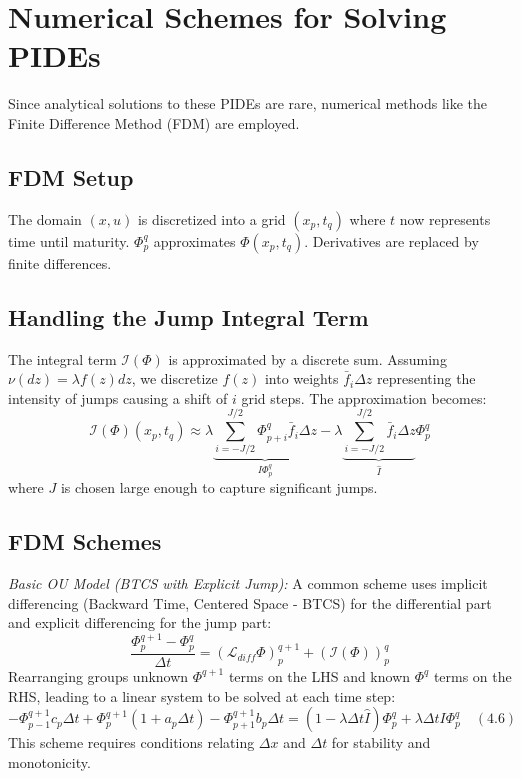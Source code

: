 \documentclass[11pt,twoside,openright]{report}
\begin{document}
\section{Numerical Schemes for Solving PIDEs}

Since analytical solutions to these PIDEs are rare, numerical methods like the Finite Difference Method (FDM) are employed.

\subsection{FDM Setup}
The domain $(x, u)$ is discretized into a grid $(x_p, t_q)$ where $t$ now represents time until maturity. $\Phi^q_p$ approximates $\Phi(x_p, t_q)$. Derivatives are replaced by finite differences.

\subsection{Handling the Jump Integral Term}
The integral term $\mathcal{I}(\Phi)$ is approximated by a discrete sum. Assuming $\nu(dz) = \lambda f(z) dz$, we discretize $f(z)$ into weights $\bar{f}_i \Delta z$ representing the intensity of jumps causing a shift of $i$ grid steps. The approximation becomes:
$$ \mathcal{I}(\Phi)(x_p, t_q) \approx \lambda \underbrace{\sum_{i=-J/2}^{J/2} \Phi^q_{p+i} \bar{f}_i \Delta z}_{I\Phi^q_p} - \lambda \underbrace{\sum_{i=-J/2}^{J/2} \bar{f}_i \Delta z}_{\hat{I}} \Phi^q_p $$
where $J$ is chosen large enough to capture significant jumps.

\subsection{FDM Schemes}

\textit{Basic OU Model (BTCS with Explicit Jump):}
A common scheme uses implicit differencing (Backward Time, Centered Space - BTCS) for the differential part and explicit differencing for the jump part:
$$ \frac{\Phi^{q+1}_p - \Phi^q_p}{\Delta t} = (\mathcal{L}_{diff}\Phi)^{q+1}_p + (\mathcal{I}(\Phi))^q_p $$
Rearranging groups unknown $\Phi^{q+1}$ terms on the LHS and known $\Phi^q$ terms on the RHS, leading to a linear system to be solved at each time step:
$$ -\Phi^{q+1}_{p-1} c_p \Delta t + \Phi^{q+1}_p (1 + a_p \Delta t) - \Phi^{q+1}_{p+1} b_p \Delta t = (1 - \lambda \Delta t \hat{I})\Phi^q_p + \lambda \Delta t I\Phi^q_p \quad (4.6) $$
This scheme requires conditions relating $\Delta x$ and $\Delta t$ for stability and monotonicity.
\end{document}
